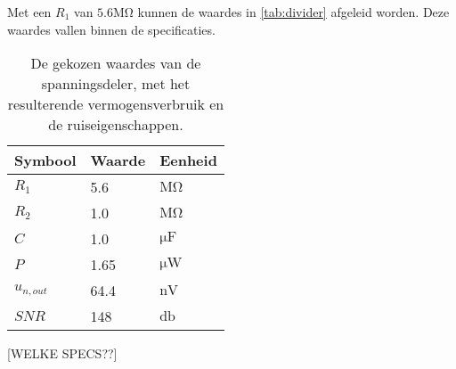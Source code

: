 Met een $R_1$ van $5.6\si{\mega\ohm}$ kunnen de waardes in \autoref{tab:divider} afgeleid worden. Deze waardes vallen binnen de specificaties.

\begin{table}[ht]
\centering
\begin{tabular}{lll}
    Symbool & Waarde & Eenheid \\
    \hline
    $R_1$       & 5.6  & $\si{\mega\ohm}$   \\
    $R_2$       & 1.0  & $\si{\mega\ohm}$   \\
    $C$         & 1.0  & $\si{\micro\farad}$\\
    $P$         & 1.65 & $\si{\micro\watt}$ \\
    $u_{n,out}$ & 64.4 & $\si{\nano\volt}$  \\
    $SNR$       & 148  & $\si{\decibel}$
\end{tabular}
\caption{De gekozen waardes van de spanningsdeler, met het resulterende vermogensverbruik en de ruiseigenschappen.}
\label{tab:divider}
\end{table}




[WELKE SPECS??]